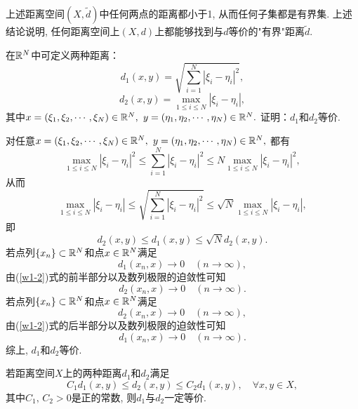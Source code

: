 \documentclass[UTF8,oneside,12pt]{article}  %
\makeatletter
\theoremstyle{DingLi1}
\numberwithin{equation}{section}
\newtheorem{remark}{\hskip 2em 注}[section]
\theoremstyle{DingLi2}
\newtheorem{example}{\hskip 2em 问题}[section]
\renewenvironment{proof}[1][\proofname]{\par%
\pushQED{\qed}%
\normalfont \topsep6\p@\@plus6\p@\relax%
\trivlist%
\item[\hskip\labelsep%
#1]\ignorespaces%
}{%
\popQED\endtrivlist\@endpefalse%
}
\renewcommand{\proofname}{\heiti\large\color{blue} 证明}%
\makeatother
\begin{document}
\begin{remark}上述距离空间$(X,\tilde{d})$中任何两点的距离都小于1, 从而任何子集都是有界集. 上述结论说明, 任何距离空间上$(X,d)$上都能够找到与$d$等价的"有界"距离$\tilde{d}$.
\end{remark}


\begin{example}
在$\Bbb{R}^N$中可定义两种距离：
    $$d_1(x,y)=\sqrt{\sum_{i=1}^N \left|\xi_i-\eta_i\right|^2},$$
    $$d_2(x,y)=\max_{1\leq i\leq N}\left|\xi_i-\eta_i\right|,$$
    其中$x=(\xi_1,\xi_2,\cdots,\xi_N)\in \Bbb{R}^N,$ $y=(\eta_1,\eta_2,\cdots,\eta_N)\in \Bbb{R}^N.$ 证明：$d_1$和$d_2$等价.
\end{example}


\begin{proof}
对任意$x=(\xi_1,\xi_2,\cdots,\xi_N)\in \Bbb{R}^N,$ $y=(\eta_1,\eta_2,\cdots,\eta_N)\in \Bbb{R}^N,$ 都有
    $$\max_{1\leq i\leq N} |\xi_i-\eta_i|^2\leq \sum_{i=1}^N |\xi_i-\eta_i|^2 \leq N\max_{1\leq i\leq N}|\xi_i-\eta_i|^2,$$
    从而
    $$\max_{1\leq i\leq N} |\xi_i-\eta_i|\leq \sqrt{\sum_{i=1}^N |\xi_i-\eta_i|^2}\leq \sqrt{N} \max_{1\leq i\leq N} |\xi_i-\eta_i|,$$
   即
    $$d_2(x,y)\leq d_1(x,y)\leq \sqrt{N} d_2(x,y).\label{w1-2}$$
若点列$\{x_n\}\subset \Bbb{R}^N$和点$x\in \Bbb{R}^N$满足
    $$d_1(x_n,x)\to 0 \quad (n\to \infty),$$
由(\ref{w1-2})式的前半部分以及数列极限的迫敛性可知
$$d_2(x_n,x)\to 0 \quad (n\to \infty).$$
若点列$\{x_n\}\subset \Bbb{R}^N$和点$x\in \Bbb{R}^N$满足
    $$d_2(x_n,x)\to 0 \quad (n\to \infty),$$
由(\ref{w1-2})式的后半部分以及数列极限的迫敛性可知
$$d_1(x_n,x)\to 0 \quad (n\to \infty).$$
综上, $d_1$和$d_2$等价.
\end{proof}


\begin{remark}
 若距离空间$X$上的两种距离$d_1$和$d_2$满足
    $$C_1 d_1(x,y)\leq d_2(x,y)\leq C_2 d_1(x,y),\quad \forall x,y\in X,$$
    其中$C_1,\,C_2>0$是正的常数, 则$d_1$与$d_2$一定等价.
\end{remark}
\end{document}
